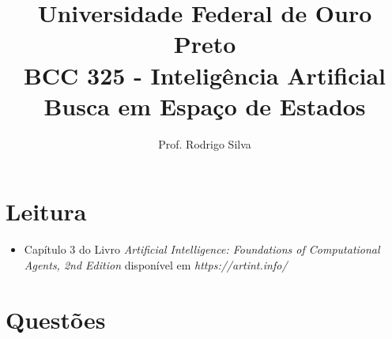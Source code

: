 \documentclass{article}
\title{\vspace{-2 cm}Universidade Federal de Ouro Preto \\ BCC 325 - Inteligência Artificial \\ Busca em Espaço de Estados}
\author{Prof. Rodrigo Silva}
\date{}
\begin{document}
\maketitle

\section{Leitura}

\begin{itemize}
    \item Capítulo 3 do Livro\textit{ Artificial Intelligence: Foundations of Computational Agents,  2nd Edition} disponível em \textit{https://artint.info/}
\end{itemize}

\section{Questões}
\end{document}
